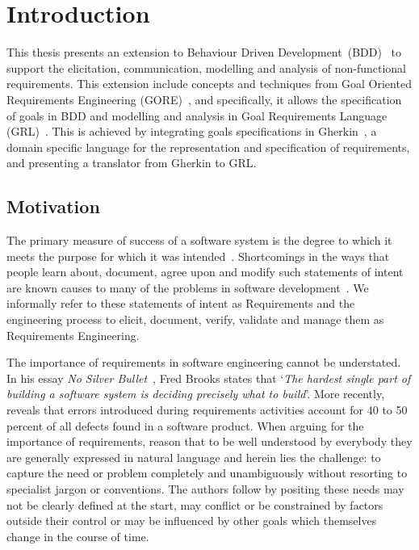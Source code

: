 \documentclass[dissertation]{softeng}
\begin{document}
\tableofcontents

\clearpage

\pagestyle{myheadings}

\chapter{Introduction}
This thesis presents an extension to Behaviour Driven Development~(BDD)~\cite{North2006} to support the elicitation, communication, modelling and analysis of non-functional requirements. This extension include concepts and techniques from Goal Oriented Requirements Engineering (GORE)~\cite{Lamsweerde:2001wpba}, and specifically, it allows the specification of goals in BDD and modelling and analysis in Goal Requirements Language (GRL)~\cite{Amyot:2010kd}. This is achieved by integrating goals specifications in Gherkin~\cite{wynne2012cucumber}, a domain specific language for the representation and specification of requirements, and presenting a translator from Gherkin to GRL.

\section{Motivation}
The primary measure of success of a software system is the degree to which it meets the purpose for which it was intended~\cite{Nuseibeh:2000ub}. Shortcomings in the ways that people learn about, document, agree upon and modify such statements of intent are known causes to many of the problems in software development~\cite{Wiegers2013}. We informally refer to these statements of intent as Requirements and the engineering process to elicit, document, verify, validate and manage them as Requirements Engineering.

The importance of requirements in software engineering cannot be understated. In his essay \emph{No Silver Bullet}~\cite{Brooks1987}, Fred Brooks states that `\emph{The hardest single part of building a software system is deciding precisely what to build}'. More recently, ~\cite{Davis200505} reveals that errors introduced during requirements activities account for 40 to 50 percent of all defects found in a software product.  When arguing for the importance of requirements, \cite{Hull2011} reason that to be well understood by everybody they are generally expressed in natural language and herein lies the challenge: to capture the need or problem completely and unambiguously without resorting to specialist jargon or conventions. The authors follow by positing these needs may not be clearly defined at the start, may conflict or be constrained by factors outside their control or may be influenced by other goals which themselves change in the course of time.
\end{document}
